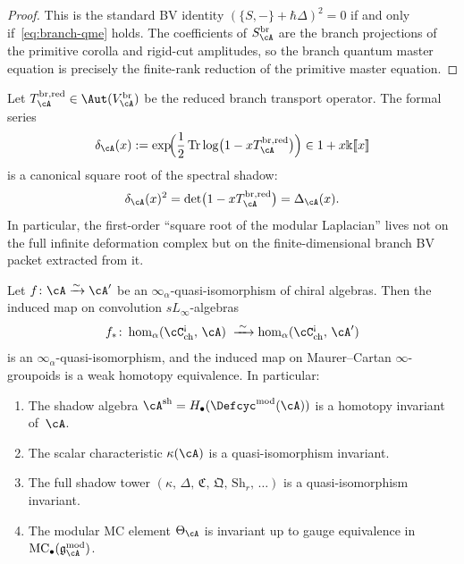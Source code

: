 \begin{proof}
This is the standard BV identity $(\{S,-\}+\hbar\Delta)^2=0$
if and only if~\eqref{eq:branch-qme} holds.  The coefficients of
$S^{\mathrm{br}}_\cA$ are the branch projections of the primitive corolla and
rigid-cut amplitudes, so the branch quantum master equation is precisely the
finite-rank reduction of the primitive master equation.
\end{proof}

\begin{corollary}
\label{cor:metaplectic-square-root}
Let $T^{\mathrm{br,red}}_\cA\in\Aut(V^{\mathrm{br}}_\cA)$ be the reduced branch
transport operator.  The formal series
\begin{equation}
\label{eq:metaplectic-square-root}
\delta_\cA(x)
:=
\exp\!\Bigl(\frac12\operatorname{Tr}\log\bigl(1-xT^{\mathrm{br,red}}_\cA\bigr)\Bigr)
\in 1+x\Bbbk[\![x]\!]
\end{equation}
is a canonical square root of the spectral shadow:
\[
\delta_\cA(x)^2
=
\det\bigl(1-xT^{\mathrm{br,red}}_\cA\bigr)
=
\Delta_\cA(x).
\]
In particular, the first-order ``square root of the modular Laplacian'' lives
not on the full infinite deformation complex but on the finite-dimensional
branch BV packet extracted from it.
\end{corollary}

\begin{theorem}
\label{thm:shadow-homotopy-invariance}
Let $f\colon \cA \xrightarrow{\sim} \cA'$ be an
$\infty_\alpha$-quasi-isomorphism of chiral algebras.  Then
the induced map on convolution $sL_\infty$-algebras
\[
f_*\colon
\operatorname{hom}_\alpha(\cC^{\textup{!`}}_{\mathrm{ch}},\, \cA)
\;\xrightarrow{\;\sim\;}
\operatorname{hom}_\alpha(\cC^{\textup{!`}}_{\mathrm{ch}},\, \cA')
\]
is an $\infty_\alpha$-quasi-isomorphism, and the induced map on
Maurer--Cartan $\infty$-groupoids is a weak homotopy equivalence.
In particular:
\begin{enumerate}[label=\textup{(\roman*)}]
\item The shadow algebra
  $\cA^{\mathrm{sh}} = H_\bullet(\Defcyc^{\mathrm{mod}}(\cA))$ is a
  homotopy invariant of~$\cA$.
\item The scalar characteristic $\kappa(\cA)$ is a
  quasi-isomorphism invariant.
\item The full shadow tower
  $(\kappa,\, \Delta,\, \mathfrak{C},\, \mathfrak{Q},\,
  \mathrm{Sh}_r,\, \ldots)$ is a quasi-isomorphism invariant.
\item The modular MC element $\Theta_\cA$ is invariant up to gauge
  equivalence in $\mathrm{MC}_\bullet(\mathfrak{g}_\cA^{\mathrm{mod}})$.
\end{enumerate}
\end{theorem}


